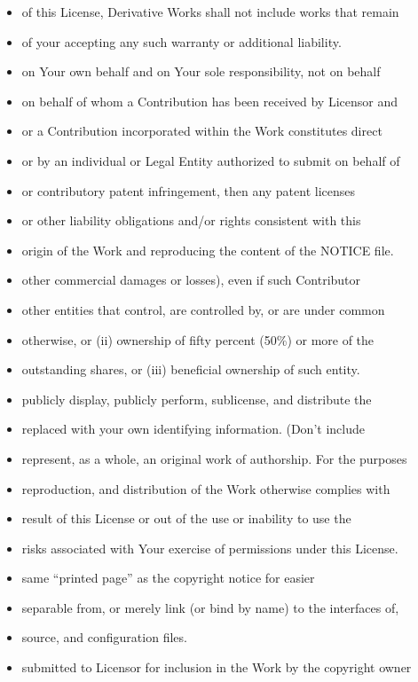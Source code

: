 \begin{itemize}
\item
  of this License, Derivative Works shall not include works that remain
\item
  of your accepting any such warranty or additional liability.
\item
  on Your own behalf and on Your sole responsibility, not on behalf
\item
  on behalf of whom a Contribution has been received by Licensor and
\item
  or a Contribution incorporated within the Work constitutes direct
\item
  or by an individual or Legal Entity authorized to submit on behalf of
\item
  or contributory patent infringement, then any patent licenses
\item
  or other liability obligations and/or rights consistent with this
\item
  origin of the Work and reproducing the content of the NOTICE file.
\item
  other commercial damages or losses), even if such Contributor
\item
  other entities that control, are controlled by, or are under common
\item
  otherwise, or (ii) ownership of fifty percent (50\%) or more of the
\item
  outstanding shares, or (iii) beneficial ownership of such entity.
\item
  publicly display, publicly perform, sublicense, and distribute the
\item
  replaced with your own identifying information. (Don't include
\item
  represent, as a whole, an original work of authorship. For the
  purposes
\item
  reproduction, and distribution of the Work otherwise complies with
\item
  result of this License or out of the use or inability to use the
\item
  risks associated with Your exercise of permissions under this License.
\item
  same ``printed page'' as the copyright notice for easier
\item
  separable from, or merely link (or bind by name) to the interfaces of,
\item
  source, and configuration files.
\item
  submitted to Licensor for inclusion in the Work by the copyright owner

\end{itemize}
